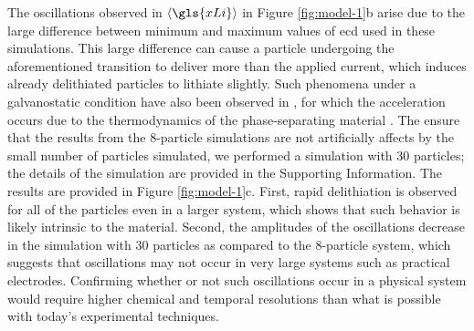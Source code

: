 \documentclass{article}
\begin{document}
The oscillations observed in $\left\langle \gls{xLi} \right\rangle$ in
Figure \ref{fig:model-1}b arise due to the large difference between
minimum and maximum values of \gls{ecd} used in these
simulations. This large difference can cause a particle undergoing the
aforementioned transition to deliver more than the applied current,
which induces already delithiated particles to lithiate slightly. Such
phenomena under a galvanostatic condition have also been observed in
, for which the acceleration occurs due to the
thermodynamics of the phase-separating material
\cite{thornton2015}. The ensure that the results from the 8-particle simulations
are not artificially affects by the small number of particles
simulated, we performed a simulation with 30 particles; the details of
the simulation are provided in the Supporting Information. The results
are provided in Figure \ref{fig:model-1}c. First, rapid delithiation
is observed for all of the particles even in a larger system, which
shows that such behavior is likely intrinsic to the material. Second,
the amplitudes of the oscillations decrease in the simulation with 30
particles as compared to the 8-particle system, which suggests that
oscillations may not occur in very large systems such as practical
electrodes.  Confirming whether or not such oscillations occur in a
physical system would require higher chemical and temporal resolutions
than what is possible with today's experimental techniques.
\end{document}
